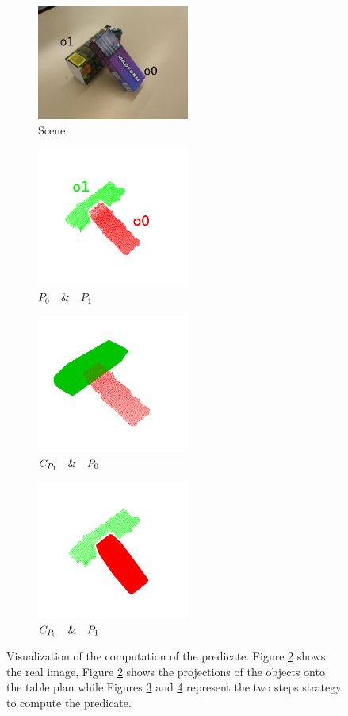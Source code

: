 \begin{figure}[h]
\centering
\begin{subfigure}[t]{0.45\textwidth}
\centering
\includegraphics[width=5cm]{Img/on/on1.jpg}
\caption{Scene}\label{fig:on_predicate_original}
\end{subfigure}
\begin{subfigure}[t]{0.45\textwidth}
\centering
\includegraphics[width=5cm]{Img/on/on2.png}
\caption{$P_0 \quad \& \quad P_1$}\label{fig:on_1}
\end{subfigure}
\begin{subfigure}[t]{0.45\textwidth}
\centering
\includegraphics[width=5cm]{Img/on/on4.png}
\caption{${\sc C_{P_{1}}} \quad \& \quad {\sc P_{0}}$}\label{fig:on_2}
\end{subfigure}
\begin{subfigure}[t]{0.45\textwidth}
\centering
\includegraphics[width=5cm]{Img/on/on3.png}
\caption{${\sc C_{P_{0}}} \quad \& \quad {\sc P_{1}}$}\label{fig:on_3}
\end{subfigure}
\caption{Visualization of the computation of the  predicate. Figure \ref{fig:on_1} shows the real image, Figure \ref{fig:on_1} shows the projections of the objects onto the table plan while Figures \ref{fig:on_2} and \ref{fig:on_3} represent the two steps strategy to compute the  predicate.}\label{fig:on_predicate}
\end{figure}

